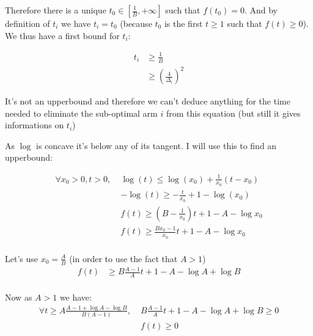 \documentclass[a4paper]{article}
\begin{document}
Therefore there is a unique $t_0 \in [\frac{1}{B}, +\infty]$ such that $f(t_0) = 0$. And by definition of $t_i$ we have $t_i = t_0$
(because $t_0$ is the first $t \ge 1$ such that $f(t) \ge 0$). We thus have a first bound for $t_i$:

\begin{equation*}
    \begin{aligned}
        t_i & \ge \frac{1}{B}                       \\
            & \ge \left(\frac{4}{\Delta_i}\right)^2
    \end{aligned}
\end{equation*}

It's not an upperbound and therefore we can't deduce anything for the time needed to eliminate the sub-optimal arm $i$ from this equation (but still
it gives informations on $t_i$)

As $\log$ is concave it's below any of its tangent. I will use this to find an upperbound:

\begin{equation*}
    \begin{aligned}
        \forall x_0 > 0, t > 0,\; & \log(t) \le \log(x_0) + \frac{1}{x_0}(t - x_0)      \\
                                  & - \log(t) \ge -\frac{t}{x_0} + 1 - \log(x_0)        \\
                                  & f(t) \ge (B - \frac{1}{x_0})t + 1 - A - \log{x_0}   \\
                                  & f(t) \ge \frac{Bx_0 - 1}{x_0} t + 1 - A - \log{x_0} \\
    \end{aligned}
\end{equation*}

Let's use $x_0 = \frac{A}{B}$ (in order to use the fact that $A > 1$)
\begin{equation*}
    \begin{aligned}
        f(t) & \ge B\frac{A - 1}{A}t + 1 - A - \log A + \log B \\
    \end{aligned}
\end{equation*}

Now as $A > 1$ we have:
\begin{equation*}
    \begin{aligned}
        \forall t \ge A\frac{A - 1 + \log A - \log B}{B(A -1)},\; & B\frac{A - 1}{A}t + 1 - A - \log A + \log B \ge 0 \\
                                                                  & f(t) \ge 0                                        \\
    \end{aligned}
\end{equation*}
\end{document}
